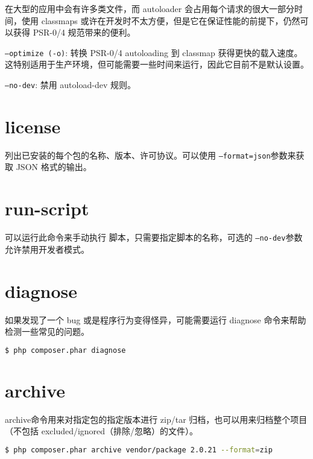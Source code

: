 在大型的应用中会有许多类文件，而 autoloader 会占用每个请求的很大一部分时间，使用 classmaps 或许在开发时不太方便，但是它在保证性能的前提下，仍然可以获得 PSR-0/4 规范带来的便利。

\begin{compactitem}
\item \texttt{--optimize (-o)}: 转换 PSR-0/4 autoloading 到 classmap 获得更快的载入速度。这特别适用于生产环境，但可能需要一些时间来运行，因此它目前不是默认设置。
\item \texttt{--no-dev}: 禁用 autoload-dev 规则。
\end{compactitem}




\section{license}

列出已安装的每个包的名称、版本、许可协议。可以使用 \texttt{--format=json}参数来获取 JSON 格式的输出。

\section{run-script}

可以运行此命令来手动执行 脚本，只需要指定脚本的名称，可选的 \texttt{--no-dev}参数允许禁用开发者模式。

\section{diagnose}

如果发现了一个 bug 或是程序行为变得怪异，可能需要运行 diagnose 命令来帮助检测一些常见的问题。

\begin{lstlisting}[language=bash]
$ php composer.phar diagnose
\end{lstlisting}

\section{archive}

archive命令用来对指定包的指定版本进行 zip/tar 归档，也可以用来归档整个项目（不包括 excluded/ignored（排除/忽略）的文件）。

\begin{lstlisting}[language=bash]
$ php composer.phar archive vendor/package 2.0.21 --format=zip
\end{lstlisting}

